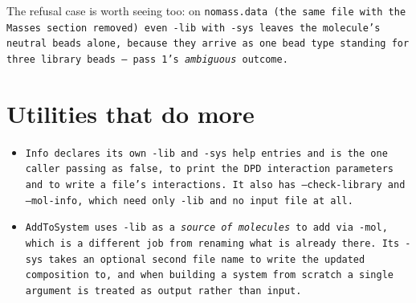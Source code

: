\noindent
The refusal case is worth seeing too: on \tt{nomass.data} (the same file with
the \tt{Masses} section removed) even \tt{-lib} with \tt{-sys} leaves the
molecule's neutral beads alone, because they arrive as one bead type standing
for three library beads --- pass 1's \emph{ambiguous} outcome.

\section{Utilities that do more}\label{sec:LibSysExtra}

\begin{itemize}[nosep,leftmargin=20pt]
  \item \tt{Info} declares its own \tt{-lib} and \tt{-sys} help entries and is
    the one caller passing  as \tt{false}, to print the DPD
    interaction parameters and to write a \field file's interactions. It also has
    \tt{--check-library} and \tt{--mol-info}, which need only \tt{-lib} and no
    input file at all.
  \item \tt{AddToSystem} uses \tt{-lib} as a \emph{source of molecules} to
    add via \tt{-mol}, which is a different job from renaming what is already
    there. Its \tt{-sys} takes an optional second file name to write the
    updated composition to, and when building a system from scratch a single
    argument is treated as output rather than input.
\end{itemize}


